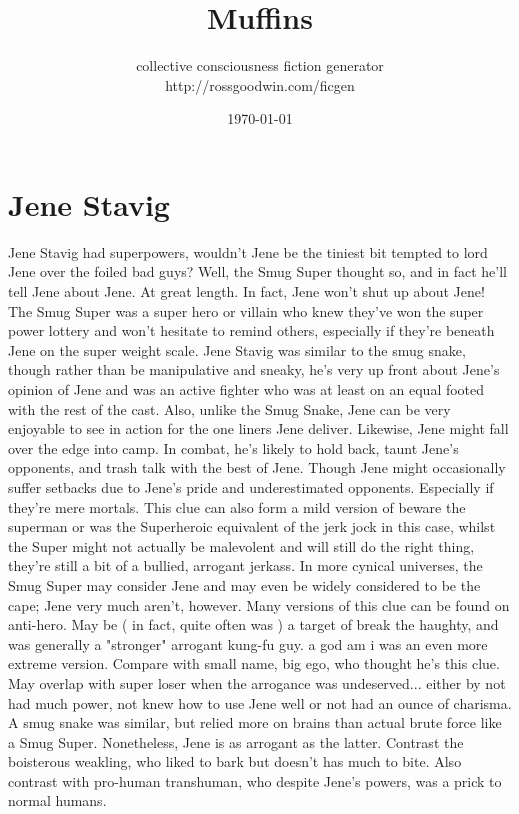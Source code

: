 \documentclass[12pt]{book}
\title{Muffins}
\author{collective consciousness fiction generator\\http://rossgoodwin.com/ficgen}
\date{\today}
\begin{document}
\maketitle



\chapter{Jene Stavig}

Jene Stavig had superpowers, wouldn't Jene be the tiniest bit tempted to lord Jene over the foiled bad guys? Well, the Smug Super thought so, and in fact he'll tell Jene about Jene. At great length. In fact, Jene won't shut up about Jene! The Smug Super was a super hero or villain who knew they've won the super power lottery and won't hesitate to remind others, especially if they're beneath Jene on the super weight scale. Jene Stavig was similar to the smug snake, though rather than be manipulative and sneaky, he's very up front about Jene's opinion of Jene and was an active fighter who was at least on an equal footed with the rest of the cast. Also, unlike the Smug Snake, Jene can be very enjoyable to see in action for the one liners Jene deliver. Likewise, Jene might fall over the edge into camp. In combat, he's likely to hold back, taunt Jene's opponents, and trash talk with the best of Jene. Though Jene might occasionally suffer setbacks due to Jene's pride and underestimated opponents. Especially if they're mere mortals. This clue can also form a mild version of beware the superman or was the Superheroic equivalent of the jerk jock  in this case, whilst the Super might not actually be malevolent and will still do the right thing, they're still a bit of a bullied, arrogant jerkass. In more cynical universes, the Smug Super may consider Jene  and may even be widely considered  to be the cape; Jene very much aren't, however. Many versions of this clue can be found on anti-hero. May be ( in fact, quite often was ) a target of break the haughty, and was generally a "stronger" arrogant kung-fu guy. a god am i was an even more extreme version. Compare with small name, big ego, who thought he's this clue. May overlap with super loser when the arrogance was undeserved... either by not had much power, not knew how to use Jene well or not had an ounce of charisma. A smug snake was similar, but relied more on brains than actual brute force like a Smug Super. Nonetheless, Jene is as arrogant as the latter. Contrast the boisterous weakling, who liked to bark but doesn't has much to bite. Also contrast with pro-human transhuman, who despite Jene's powers, was a prick to normal humans.
\end{document}
